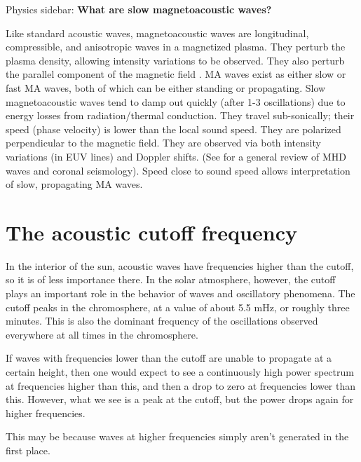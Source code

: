 \begin{framed}
    Physics sidebar: \textbf{What are slow magnetoacoustic waves?}

    Like standard acoustic waves, magnetoacoustic waves are longitudinal,
    compressible, and anisotropic waves in a magnetized plasma.
    They perturb the plasma density, allowing intensity variations to be
    observed.
    They also perturb the parallel component of the magnetic field
    .
    MA waves exist as either slow or fast MA waves, both of which can be either
    standing or propagating.
    Slow magnetoacoustic waves tend to damp out
    quickly (after 1-3 oscillations) due to energy losses from
    radiation/thermal conduction.
    They travel sub-sonically; their
    speed (phase velocity) is lower than the local sound speed.
    They are polarized perpendicular to the magnetic field.
    They are observed
    via both intensity variations (in EUV lines) and Doppler shifts.
    (See \cite{Nakariakov2005} for a general review of MHD waves and coronal
    seismology).
    Speed close to sound speed
    allows interpretation of slow, propagating MA waves.
\end{framed}



\newpage
\section{The acoustic cutoff frequency}
In the interior of the sun, acoustic waves have frequencies higher than the
cutoff, so it is of less importance there. In the solar atmosphere, however,
the cutoff plays an important role in the behavior of waves and oscillatory
phenomena.
The cutoff peaks in the chromosphere, at a value of about 5.5 mHz,
or roughly three minutes. This is also the dominant frequency of the
oscillations observed everywhere at all times in the chromosphere.

If waves with frequencies lower than the cutoff are unable to propagate
at a certain height, then one would expect to see a continuously high power
spectrum at frequencies higher than this, and then a drop to zero at
frequencies lower than this. However, what we see is a peak at the cutoff,
but the power drops again for higher frequencies.


This may be because waves at higher frequencies simply aren't generated
in the first place.

